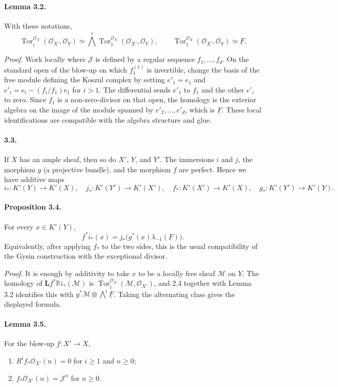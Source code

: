 \documentclass[11pt]{article}
\theoremstyle{plain}
\theoremstyle{definition}
\theoremstyle{remark}
\newcommand{\RR}{\mathbb R}
\newcommand{\cJ}{\mathcal J}\newcommand{\cK}{\mathcal K}\newcommand{\cL}{\mathcal L}
\newcommand{\cM}{\mathcal M}\newcommand{\cN}{\mathcal N}\newcommand{\cO}{\mathcal O}
\DeclareMathOperator{\Tor}{Tor}
\providecommand{\uF}{\underline{F}}
\providecommand{\LL}{\mathbf L}
\begin{document}
\paragraph{Lemma 3.2.} With these notations,
\[
\Tor_i^{\cO_X}(\cO_{X'},\cO_Y)\simeq \bigwedge^i\Tor_1^{\cO_X}(\cO_{X'},\cO_Y),
\qquad
\Tor_1^{\cO_X}(\cO_{X'},\cO_Y)\simeq \uF.
\]

\emph{Proof.} Work locally where $\cJ$ is defined by a regular sequence $f_1,\ldots,f_d$. On the standard open of the blow-up on which $f_1^{(1)}$ is invertible, change the basis of the free module defining the Koszul complex by setting $e'_1=e_1$ and $e'_i=e_i-(f_i/f_1)e_1$ for $i>1$. The differential sends $e'_1$ to $f_1$ and the other $e'_i$ to zero. Since $f_1$ is a non-zero-divisor on that open, the homology is the exterior algebra on the image of the module spanned by $e'_2,\ldots,e'_d$, which is $\uF$. These local identifications are compatible with the algebra structure and glue.

\paragraph{3.3.} If $X$ has an ample sheaf, then so do $X'$, $Y$, and $Y'$. The immersions $i$ and $j$, the morphism $g$ (a projective bundle), and the morphism $f$ are perfect. Hence we have additive maps
\[
i_*:K'(Y)\to K'(X),\quad j_*:K'(Y')\to K'(X'),\quad
f_*:K'(X')\to K'(X),\quad g_*:K'(Y')\to K'(Y).
\]

\paragraph{Proposition 3.4.} For every $x\in K'(Y)$,
\[
f^*i_*(x)=j_*\bigl(g^*(x)\lambda_{-1}(\uF)\bigr).
\]
Equivalently, after applying $f_*$ to the two sides, this is the usual compatibility of the Gysin construction with the exceptional divisor.

\emph{Proof.} It is enough by additivity to take $x$ to be a locally free sheaf $\cM$ on $Y$. The homology of $\LL f^*\RR i_*(\cM)$ is $\Tor_i^{\cO_X}(\cM,\cO_{X'})$, and 2.4 together with Lemma 3.2 identifies this with $g^*\cM\otimes\bigwedge^i\uF$. Taking the alternating class gives the displayed formula.

\paragraph{Lemma 3.5.} For the blow-up $f:X'\to X$,
\begin{enumerate}[label=\roman*)]
\item $R^if_*\cO_{X'}(n)=0$ for $i\geq1$ and $n\geq0$;
\item $f_*\cO_{X'}(n)=\cJ^n$ for $n\geq0$.
\end{enumerate}
\end{document}
